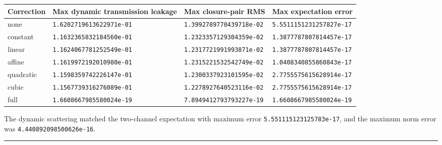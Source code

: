 \documentclass[
  a4paper,
]{article}
\newcounter{none} %
\begin{document}
{\def\LTcaptype{none} %
\begin{longtable}[]{@{}
  >{\raggedright\arraybackslash}p{}
  >{\raggedleft\arraybackslash}p{}
  >{\raggedleft\arraybackslash}p{}
  >{\raggedleft\arraybackslash}p{}@{}}
\toprule\noalign{}
\begin{minipage}[b]{\linewidth}\raggedright
Correction
\end{minipage} & \begin{minipage}[b]{\linewidth}\raggedleft
Max dynamic transmission leakage
\end{minipage} & \begin{minipage}[b]{\linewidth}\raggedleft
Max closure-pair RMS
\end{minipage} & \begin{minipage}[b]{\linewidth}\raggedleft
Max expectation error
\end{minipage} \\
\midrule\noalign{}
\endhead
\bottomrule\noalign{}
\endlastfoot
none & \texttt{1.6202719613622971e-01} & \texttt{1.3992789770439718e-02}
& \texttt{5.5511151231257827e-17} \\
constant & \texttt{1.1632365832184560e-01} &
\texttt{1.2323357129304359e-02} & \texttt{1.3877787807814457e-17} \\
linear & \texttt{1.1624067781252549e-01} &
\texttt{1.2317721991993871e-02} & \texttt{1.3877787807814457e-17} \\
affine & \texttt{1.1619972192010980e-01} &
\texttt{1.2315221532542749e-02} & \texttt{1.0408340855860843e-17} \\
quadratic & \texttt{1.1598359742226147e-01} &
\texttt{1.2300337923101595e-02} & \texttt{2.7755575615628914e-17} \\
cubic & \texttt{1.1567739316276089e-01} &
\texttt{1.2278927640523116e-02} & \texttt{2.7755575615628914e-17} \\
full & \texttt{1.6608667985580024e-19} & \texttt{7.8949412793793227e-19}
& \texttt{1.6608667985580024e-19} \\
\end{longtable}
}

The dynamic scattering matched the two-channel expectation with maximum
error \texttt{5.551115123125783e-17}, and the maximum norm error was
\texttt{4.440892098500626e-16}.

\begin{center}\rule{0.5\linewidth}{0.5pt}\end{center}
\end{document}
